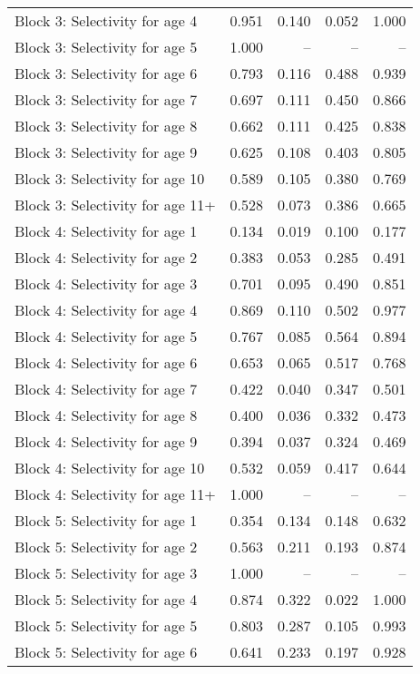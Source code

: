 \documentclass[
]{article}
\begin{document}
\begin{landscape}
\begin{longtable}[t]{lrrrr}
\addlinespace
Block 3: Selectivity for age 4 & 0.951 & 0.140 & 0.052 & 1.000\\
Block 3: Selectivity for age 5 & 1.000 & -- & -- & --\\
Block 3: Selectivity for age 6 & 0.793 & 0.116 & 0.488 & 0.939\\
Block 3: Selectivity for age 7 & 0.697 & 0.111 & 0.450 & 0.866\\
Block 3: Selectivity for age 8 & 0.662 & 0.111 & 0.425 & 0.838\\
\addlinespace
Block 3: Selectivity for age 9 & 0.625 & 0.108 & 0.403 & 0.805\\
Block 3: Selectivity for age 10 & 0.589 & 0.105 & 0.380 & 0.769\\
Block 3: Selectivity for age 11+ & 0.528 & 0.073 & 0.386 & 0.665\\
Block 4: Selectivity for age 1 & 0.134 & 0.019 & 0.100 & 0.177\\
Block 4: Selectivity for age 2 & 0.383 & 0.053 & 0.285 & 0.491\\
\addlinespace
Block 4: Selectivity for age 3 & 0.701 & 0.095 & 0.490 & 0.851\\
Block 4: Selectivity for age 4 & 0.869 & 0.110 & 0.502 & 0.977\\
Block 4: Selectivity for age 5 & 0.767 & 0.085 & 0.564 & 0.894\\
Block 4: Selectivity for age 6 & 0.653 & 0.065 & 0.517 & 0.768\\
Block 4: Selectivity for age 7 & 0.422 & 0.040 & 0.347 & 0.501\\
\addlinespace
Block 4: Selectivity for age 8 & 0.400 & 0.036 & 0.332 & 0.473\\
Block 4: Selectivity for age 9 & 0.394 & 0.037 & 0.324 & 0.469\\
Block 4: Selectivity for age 10 & 0.532 & 0.059 & 0.417 & 0.644\\
Block 4: Selectivity for age 11+ & 1.000 & -- & -- & --\\
Block 5: Selectivity for age 1 & 0.354 & 0.134 & 0.148 & 0.632\\
\addlinespace
Block 5: Selectivity for age 2 & 0.563 & 0.211 & 0.193 & 0.874\\
Block 5: Selectivity for age 3 & 1.000 & -- & -- & --\\
Block 5: Selectivity for age 4 & 0.874 & 0.322 & 0.022 & 1.000\\
Block 5: Selectivity for age 5 & 0.803 & 0.287 & 0.105 & 0.993\\
Block 5: Selectivity for age 6 & 0.641 & 0.233 & 0.197 & 0.928\\

\end{longtable}
\end{landscape}
\end{document}
